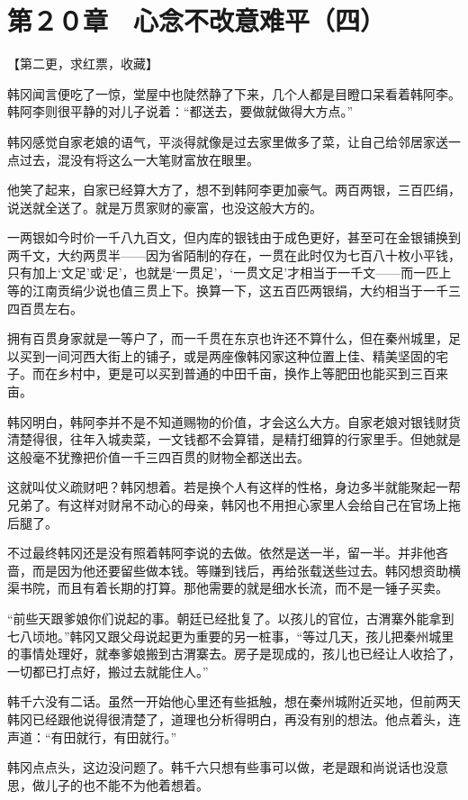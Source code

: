 \section{第２０章　心念不改意难平（四）}

【第二更，求红票，收藏】

韩冈闻言便吃了一惊，堂屋中也陡然静了下来，几个人都是目瞪口呆看着韩阿李。韩阿李则很平静的对儿子说着：“都送去，要做就做得大方点。”

韩冈感觉自家老娘的语气，平淡得就像是过去家里做多了菜，让自己给邻居家送一点过去，混没有将这么一大笔财富放在眼里。

他笑了起来，自家已经算大方了，想不到韩阿李更加豪气。两百两银，三百匹绢，说送就全送了。就是万贯家财的豪富，也没这般大方的。

一两银如今时价一千八九百文，但内库的银钱由于成色更好，甚至可在金银铺换到两千文，大约两贯半——因为省陌制的存在，一贯在此时仅为七百八十枚小平钱，只有加上‘文足’或‘足’，也就是‘一贯足’，‘一贯文足’才相当于一千文——而一匹上等的江南贡绢少说也值三贯上下。换算一下，这五百匹两银绢，大约相当于一千三四百贯左右。

拥有百贯身家就是一等户了，而一千贯在东京也许还不算什么，但在秦州城里，足以买到一间河西大街上的铺子，或是两座像韩冈家这种位置上佳、精美坚固的宅子。而在乡村中，更是可以买到普通的中田千亩，换作上等肥田也能买到三百来亩。

韩冈明白，韩阿李并不是不知道赐物的价值，才会这么大方。自家老娘对银钱财货清楚得很，往年入城卖菜，一文钱都不会算错，是精打细算的行家里手。但她就是这般毫不犹豫把价值一千三四百贯的财物全都送出去。

这就叫仗义疏财吧？韩冈想着。若是换个人有这样的性格，身边多半就能聚起一帮兄弟了。有这样对财帛不动心的母亲，韩冈也不用担心家里人会给自己在官场上拖后腿了。

不过最终韩冈还是没有照着韩阿李说的去做。依然是送一半，留一半。并非他吝啬，而是因为他还要留些做本钱。等赚到钱后，再给张载送些过去。韩冈想资助横渠书院，而且有着长期的打算。那他需要的就是细水长流，而不是一锤子买卖。

“前些天跟爹娘你们说起的事。朝廷已经批复了。以孩儿的官位，古渭寨外能拿到七八顷地。”韩冈又跟父母说起更为重要的另一桩事，“等过几天，孩儿把秦州城里的事情处理好，就奉爹娘搬到古渭寨去。房子是现成的，孩儿也已经让人收拾了，一切都已打点好，搬过去就能住人。”

韩千六没有二话。虽然一开始他心里还有些抵触，想在秦州城附近买地，但前两天韩冈已经跟他说得很清楚了，道理也分析得明白，再没有别的想法。他点着头，连声道：“有田就行，有田就行。”

韩冈点点头，这边没问题了。韩千六只想有些事可以做，老是跟和尚说话也没意思，做儿子的也不能不为他着想着。

